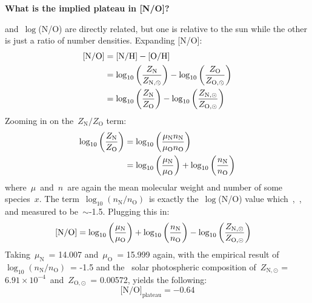 \documentclass[\main/notes.tex]{subfiles}
\begin{document}
\twolineskip 
\textbf{What is the implied plateau in [N/O]?} 
\par\noindent 
[N/O] and~$\log$(N/O) are directly related, but one is relative to the sun 
while the other is just a ratio of number densities. Expanding [N/O]: 
\begin{subequations}\begin{align} 
\text{[N/O]} &= \text{[N/H]} - \text{[O/H]} \\ 
&= \log_{10}\left(\frac{\displaystyle Z_\text{N}}{\displaystyle Z_{\text{N},\odot}}\right) - 
\log_{10}\left(\frac{\displaystyle Z_\text{O}}{\displaystyle Z_{\text{O},\odot}}\right) 
\\ 
&= \log_{10}\left(\frac{\displaystyle Z_\text{N}}{\displaystyle Z_\text{O}}\right) - \log_{10}\left(
\frac{\displaystyle Z_{\text{N},\odot}}{\displaystyle Z_{\text{O},\odot}}\right) 
\end{align}\end{subequations} 
Zooming in on the~$Z_\text{N}/Z_\text{O}$ term: 
\begin{subequations}\begin{align} 
\log_{10}\left(\frac{\displaystyle Z_\text{N}}{\displaystyle Z_\text{O}}\right) &= 
\log_{10}\left(\frac{\displaystyle \mu_\text{N}n_\text{N}}{\displaystyle \mu_\text{O}n_\text{O}}\right) \\ 
&= \log_{10}\left(\frac{\displaystyle \mu_\text{N}}{\displaystyle \mu_\text{O}}\right) + \log_{10}\left(
\frac{\displaystyle n_\text{N}}{\displaystyle n_\text{O}}\right) 
\end{align}\end{subequations} 
where~$\mu$~and~$n$~are again the mean molecular weight and number of some 
species~$x$. The term~$\log_{10}\left(n_\text{N}/n_\text{O}\right)$~is exactly 
the~$\log$(N/O) value which~\citet{Berg2012},~\citet*{Izotov2012}, and 
\citet{James2015} measured to be~$\sim$-1.5. Plugging this in: 
\begin{subequations}\begin{align} 
\text{[N/O]} &= \log_{10}\left(\frac{\displaystyle \mu_\text{N}}{\displaystyle \mu_\text{O}}\right) + 
\log_{10}\left(\frac{\displaystyle n_\text{N}}{\displaystyle n_\text{O}}\right) - \log_{10}\left(
\frac{\displaystyle Z_{\text{N},\odot}}{\displaystyle Z_{\text{O},\odot}}\right) 
\end{align}\end{subequations} 
Taking~$\mu_\text{N}$~= 14.007 and~$\mu_\text{O}$~= 15.999 again, with the 
empirical result of~$\log_{10}\left(n_\text{N}/n_\text{O}\right)$~= -1.5 and 
the~\citet{Asplund2009} solar photospheric composition of~$Z_{\text{N},\odot}$ 
= $6.91\times10^{-4}$~and~$Z_{\text{O},\odot}$~= 0.00572, yields the following: 
\begin{equation} 
\text{[N/O]}_\text{plateau} = -0.64 
\end{equation} 
\end{document}
